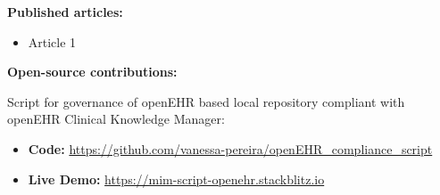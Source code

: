 \documentclass[mim_thesis.tex]{subfiles}
\begin{document}
\textbf{Published articles:}
\begin{itemize}
	\item Article 1
    
\end{itemize}




\textbf{Open-source contributions:}

Script for governance of openEHR based local repository compliant with openEHR Clinical Knowledge Manager:
    \begin{itemize} [noitemsep]
    \item \textbf{Code:} \url{https://github.com/vanessa-pereira/openEHR_compliance_script}        
    \item \textbf{Live Demo:} \url{https://mim-script-openehr.stackblitz.io}
    \end{itemize}
    
\end{document}
